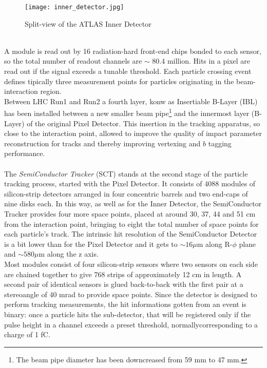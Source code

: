 \vspace{0.5cm}
\begin{figure}[t]
\centering
\texttt{[image: inner\_detector.jpg]}
\caption{Split-view of the ATLAS Inner Detector}
\label{split_view}
\end{figure}
\\A module is read out by 16 radiation-hard front-end chips\cite{PERIC2006178} bonded to each sensor, so the total number of readout channels are $\sim$ 80.4 million. Hits in a pixel are read out if the signal exceeds a tunable threshold. Each particle crossing event defines tipically three measurement points for particles originating in the beam-interaction region.
\\
Between LHC Run1 and Run2 a fourth layer, konw as Insertiable B-Layer (IBL)\cite{Capeansjnh} has been installed between a new smaller beam pipe\footnote{The beam pipe diameter has been downcreased from 59 mm to 47 mm.} and the innermost layer (B-Layer) of the original Pixel Detector. This insertion in the tracking apparatus, so close to the interaction point, allowed to improve the quality of impact parameter reconstruction for tracks and thereby improving vertexing and $b$ tagging performance.
\\\\
\phantom{1}\hspace{0.3cm}The \emph{SemiConductor Tracker} (SCT) \cite{ABDESSELAM2006642, ABDESSELAM2007353} stands at the second stage of the particle tracking process, started with the Pixel Detector. It consists of 4088 modules of silicon-strip detectors arranged in four concentric barrels and two end-caps of nine disks each. In this way, as well as for the Inner Detector, the SemiConductor Tracker provides four more space points, placed at around 30, 37, 44 and 51 cm from the interaction point, bringing to eight the total number of space points for each particle's track. The intrinsic hit resolution of the SemiConductor Detector is a bit lower than for the Pixel Detector and it gets to $\sim 16 \mu$m along R-$\phi$ plane and $\sim 580 \mu$m along the z axis.
\\
Most modules consist of four silicon-strip sensors\cite{AHMAD200798} where two sensors on each side are chained together to give 768 strips of approximately 12 cm in length. A second pair of identical sensors is glued back-to-back with the first pair at a stereoangle of 40 mrad to provide space points. Since the detector is designed to perform tracking measurements, the hit informations gotten from an event is binary: once a particle hits the sub-detector, that will be registered only if the pulse height in a channel exceeds a preset threshold, normallycorresponding to a charge of 1 fC.

